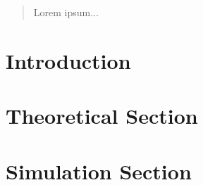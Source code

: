 \documentclass[12pt,a4paper]{article}
\begin{document}
\begin{abstract}
Lorem ipsum...
\end{abstract}

\clearpage
\thispagestyle{plain}
\tableofcontents
\pagebreak
{}

\pagebreak
\section{Introduction}
\section{Theoretical Section}
\section{Simulation Section}

\pagebreak
{}
\setcounter{page}{\thesavepage}
\pagestyle{plain}
%
%
\printbibliography[]
\clearpage
\appendix
\end{document}
